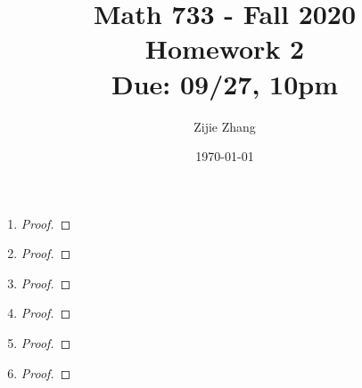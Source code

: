 \documentclass{article}
\title{Math 733 - Fall 2020\\
        {\Large \textbf{Homework 2}}\\
        {\normalsize \textbf{Due: 09/27, 10pm}}
    }
\author{Zijie Zhang}
\date{\today}
\begin{document}
    \maketitle
    \begin{enumerate}
        \item \begin{proof}
            
        \end{proof}

        \item \begin{proof}
            
        \end{proof}

        \item \begin{proof}
            
        \end{proof}

        \item \begin{proof}
            
        \end{proof}

        \item \begin{proof}
            
        \end{proof}

        \item \begin{proof}
            
        \end{proof}
    
    \end{enumerate}
\end{document}
